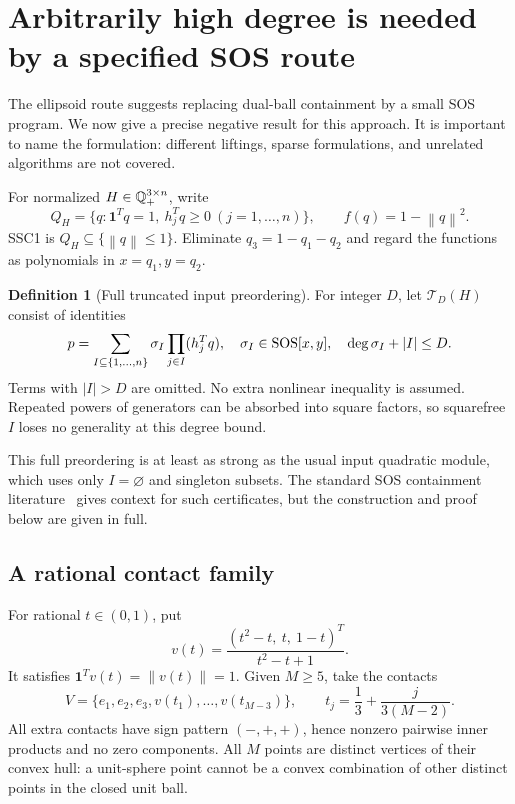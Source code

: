 \documentclass[11pt]{article}
\theoremstyle{definition}\newtheorem{definition}[theorem]{Definition}
\newcommand{\e}{\mathbf1}\newcommand{\cone}{\operatorname{cone}}
\newcommand{\norm}[1]{\left\lVert#1\right\rVert}\newcommand{\Tr}{\mathcal T}
\begin{document}
\section{Arbitrarily high degree is needed by a specified SOS route}
\label{sec:sos}
The ellipsoid route suggests replacing dual-ball containment by a small SOS program. We now give a precise negative result for this approach. It is important to name the formulation: different liftings, sparse formulations, and unrelated algorithms are not covered.

For normalized $H\in\mathbb Q_+^{3\times n}$, write
\begin{equation}
 Q_H=\{q:\e^Tq=1,\ h_j^Tq\ge0\ (j=1,\ldots,n)\},\qquad
 f(q)=1-\norm{q}^2.
\end{equation}
SSC1 is $Q_H\subseteq\{\norm{q}\le1\}$. Eliminate $q_3=1-q_1-q_2$ and regard the functions as polynomials in $x=q_1,y=q_2$.

\begin{definition}[Full truncated input preordering]
For integer $D$, let $\Tr_D(H)$ consist of identities
\begin{equation}
 p=\sum_{I\subseteq\{1,\ldots,n\}}\sigma_I\prod_{j\in I}(h_j^Tq),
 \quad \sigma_I\in\operatorname{SOS}[x,y],\quad \deg\sigma_I+|I|\le D.
 \label{eq:preorder}
\end{equation}
Terms with $|I|>D$ are omitted. No extra nonlinear inequality is assumed. Repeated powers of generators can be absorbed into square factors, so squarefree $I$ loses no generality at this degree bound.
\end{definition}
This full preordering is at least as strong as the usual input quadratic module, which uses only $I=\varnothing$ and singleton subsets. The standard SOS containment literature~\cite{kt,ktt} gives context for such certificates, but the construction and proof below are given in full.

\subsection{A rational contact family}
For rational $t\in(0,1)$, put
\begin{equation}
 v(t)=\frac{(t^2-t,\ t,\ 1-t)^T}{t^2-t+1}.
 \label{eq:circleparam}
\end{equation}
It satisfies $\e^Tv(t)=\norm{v(t)}=1$. Given $M\ge5$, take the contacts
\begin{equation}
 V=\{e_1,e_2,e_3,v(t_1),\ldots,v(t_{M-3})\},\qquad
 t_j=\frac13+\frac{j}{3(M-2)}.
 \label{eq:contacts}
\end{equation}
All extra contacts have sign pattern $(-,+,+)$, hence nonzero pairwise inner products and no zero components. All $M$ points are distinct vertices of their convex hull: a unit-sphere point cannot be a convex combination of other distinct points in the closed unit ball.
\end{document}
